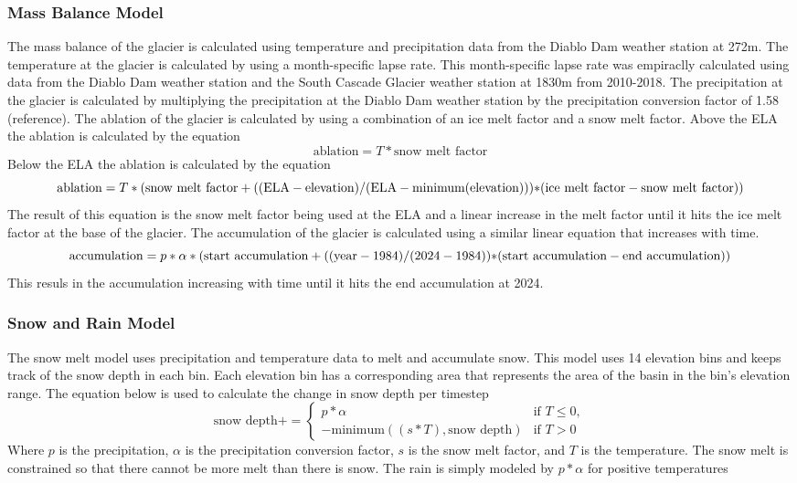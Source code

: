 \documentclass{article}
\begin{document}
\subsubsection{Mass Balance Model}
The mass balance of the glacier is calculated using temperature and precipitation data from the Diablo Dam weather station at 272m. The 
temperature at the glacier is calculated by using a month-specific lapse rate. This month-specific lapse rate was empiraclly calculated using
data from the Diablo Dam weather station and the South Cascade Glacier weather station at 1830m from 2010-2018. The precipitation at the 
glacier is calculated by multiplying the precipitation at the Diablo Dam weather station by the precipitation conversion factor of 1.58 
(reference). The ablation of the glacier is calculated by using a combination of an ice melt factor and a snow melt factor. Above the ELA the 
ablation is calculated by the equation
\begin{equation}\text{ablation}=T*\text{snow melt factor}\end{equation}
Below the ELA the ablation is calculated by the equation
\begin{equation}\text{ablation}=T*(\text{snow melt factor}+((\text{ELA}-\text{elevation})/(\text{ELA}-\text{minimum(elevation)}))*$$
$$(\text{ice melt factor}-\text{snow melt factor}))\end{equation}
The result of this equation is the snow melt factor being used at the ELA and a linear increase in the melt factor until it hits the ice melt 
factor at the base of the glacier. 
The accumulation of the glacier is calculated using a similar linear equation that increases with time.
\begin{equation}\text{accumulation}=p*\alpha*(\text{start accumulation}+((\text{year}-1984)/(2024-1984))*$$
$$(\text{start accumulation}-\text{end accumulation}))\end{equation}
This resuls in the accumulation increasing with time until it hits the end accumulation at 2024. 

\subsubsection{Snow and Rain Model}
The snow melt model uses precipitation and temperature data to melt and accumulate snow. This model uses 14 elevation bins and keeps track 
of the snow depth in each bin. Each elevation bin has a corresponding area that represents the area of the basin in the bin's elevation range. 
The equation below is used to calculate the change in snow depth per timestep 
\begin{equation}\text{snow depth} += 
\begin{cases} 
  p*\alpha & \text{if } T \leq 0,\\
  -\text{minimum}((s*T),\text{snow depth}) & \text{if } T > 0
\end{cases}\end{equation}
Where $p$ is the precipitation, $\alpha$ is the precipitation conversion factor, $s$ is the snow melt factor, and $T$ is 
the temperature. The snow melt is constrained so that there cannot be more melt than there is snow. The rain is simply modeled by $p*\alpha$ 
for positive temperatures
\end{document}
